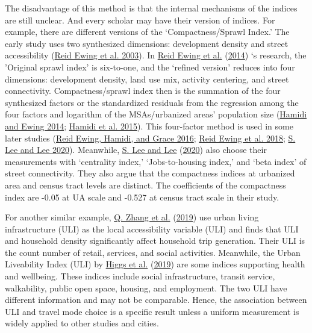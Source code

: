 \documentclass[
  12pt,
]{article}
\begin{document}
The disadvantage of this method is that the internal mechanisms of the indices are still unclear. And every scholar may have their version of indices. For example, there are different versions of the `Compactness/Sprawl Index.' The early study uses two synthesized dimensions: development density and street accessibility (\protect\hyperlink{ref-ewingRelationshipUrbanSprawl2003}{Reid Ewing et al. 2003}). In \protect\hyperlink{ref-ewingRelationshipUrbanSprawl2014}{Reid Ewing et al.} (\protect\hyperlink{ref-ewingRelationshipUrbanSprawl2014}{2014}) `s research, the 'Original sprawl index' is six-to-one, and the `refined version' reduces into four dimensions: development density, land use mix, activity centering, and street connectivity. Compactness/sprawl index then is the summation of the four synthesized factors or the standardized residuals from the regression among the four factors and logarithm of the MSAs/urbanized areas' population size (\protect\hyperlink{ref-hamidiLongitudinalStudyChanges2014}{Hamidi and Ewing 2014}; \protect\hyperlink{ref-hamidiMeasuringSprawlIts2015}{Hamidi et al. 2015}). This four-factor method is used in some later studies (\protect\hyperlink{ref-ewingUrbanSprawlRisk2016}{Reid Ewing, Hamidi, and Grace 2016}; \protect\hyperlink{ref-ewingTestingNewmanKenworthy2018}{Reid Ewing et al. 2018}; \protect\hyperlink{ref-leeComparingImpactsLocal2020}{S. Lee and Lee 2020}). Meanwhile, \protect\hyperlink{ref-leeComparingImpactsLocal2020}{S. Lee and Lee} (\protect\hyperlink{ref-leeComparingImpactsLocal2020}{2020}) also choose their measurements with `centrality index,' `Jobs-to-housing index,' and `beta index' of street connectivity. They also argue that the compactness indices at urbanized area and census tract levels are distinct. The coefficients of the compactness index are -0.05 at UA scale and -0.527 at census tract scale in their study.

For another similar example, \protect\hyperlink{ref-zhangHouseholdTripGeneration2019}{Q. Zhang et al.} (\protect\hyperlink{ref-zhangHouseholdTripGeneration2019}{2019}) use urban living infrastructure (ULI) as the local accessibility variable (ULI) and finds that ULI and household density significantly affect household trip generation. Their ULI is the count number of retail, services, and social activities. Meanwhile, the Urban Liveability Index (ULI) by \protect\hyperlink{ref-higgsUrbanLiveabilityIndex2019}{Higgs et al.} (\protect\hyperlink{ref-higgsUrbanLiveabilityIndex2019}{2019}) are some indices supporting health and wellbeing. These indices include social infrastructure, transit service, walkability, public open space, housing, and employment. The two ULI have different information and may not be comparable. Hence, the association between ULI and travel mode choice is a specific result unless a uniform measurement is widely applied to other studies and cities.
\end{document}
